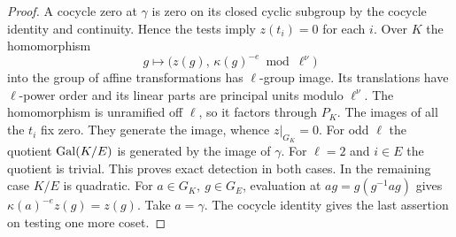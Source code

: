 \documentclass[a4paper,11pt]{article}
\theoremstyle{definition}
\theoremstyle{remark}
\numberwithin{equation}{section}
\begin{document}
\begin{proof}
A cocycle zero at \(\gamma\) is zero on its closed cyclic
subgroup by the cocycle identity and continuity. Hence the
tests imply \(z(t_i)=0\) for each \(i\). Over \(K\) the
homomorphism
\[
   g\longmapsto \bigl(z(g),\,\kappa(g)^{-e}\bmod\ell^\nu\bigr)
\]
into the group of affine transformations has \(\ell\)-group
image. Its translations have \(\ell\)-power order and its
linear parts are principal units modulo \(\ell^\nu\).
The homomorphism is unramified off \(\ell\), so it factors
through \(P_K\). The images of all the \(t_i\) fix zero.
They generate the image, whence \(z|_{G_K}=0\). For odd
\(\ell\) the quotient \(\operatorname{Gal}(K/E)\) is generated by the
image of \(\gamma\). For \(\ell=2\) and \(i\in E\) the
quotient is trivial. This proves exact detection in both
cases. In the remaining case \(K/E\) is quadratic. For
\(a\in G_K,\ g\in G_E\), evaluation at \(ag=g(g^{-1}ag)\)
gives \(\kappa(a)^{-e}z(g)=z(g)\). Take \(a=\gamma\).
The cocycle identity gives the last assertion on testing
one more coset.
\end{proof}
\end{document}
